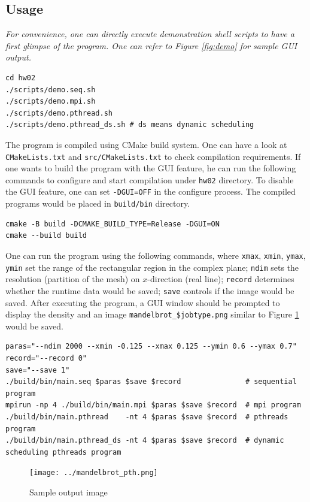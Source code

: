 \documentclass[twoside,12pt]{article}
\theoremstyle{definition}
\theoremstyle{remark}
\begin{document}
\subsection{Usage}
\textit{\color{red}
For convenience, one can directly execute 
demonstration shell scripts to have a first glimpse of the program.
One can refer to Figure \ref{fig:demo} for sample GUI output.
}
\begin{lstlisting}[style=sh]
cd hw02
./scripts/demo.seq.sh
./scripts/demo.mpi.sh
./scripts/demo.pthread.sh
./scripts/demo.pthread_ds.sh # ds means dynamic scheduling
\end{lstlisting}

The program is compiled using CMake build system.
One can have a look at \lstinline|CMakeLists.txt| and \lstinline|src/CMakeLists.txt| 
to check compilation requirements.
If one wants to build the program with the GUI feature, he can run the following commands to
configure and start compilation under \lstinline|hw02| directory.
To disable the GUI feature, one can set \lstinline|-DGUI=OFF| in the configure process.
The compiled programs would be placed in \lstinline|build/bin| directory.
\begin{lstlisting}[style=sh]
cmake -B build -DCMAKE_BUILD_TYPE=Release -DGUI=ON
cmake --build build
\end{lstlisting}

One can run the program using the following commands,
where \lstinline|xmax|, \lstinline|xmin|, \lstinline|ymax|, \lstinline|ymin|
set the range of the rectangular region in the complex plane;
\lstinline|ndim| sets the resolution (partition of the mesh) on
$x$-direction (real line);
\lstinline|record| determines whether the runtime data would be saved;
\lstinline|save| controls if the image would be saved.
After executing the program,
a GUI window should be prompted to display the density
and an image \lstinline|mandelbrot_$jobtype.png| similar to 
Figure \ref{fig:image} would be saved.
\begin{lstlisting}[style=sh]
paras="--ndim 2000 --xmin -0.125 --xmax 0.125 --ymin 0.6 --ymax 0.7"
record="--record 0"
save="--save 1"
./build/bin/main.seq $paras $save $record               # sequential program
mpirun -np 4 ./build/bin/main.mpi $paras $save $record  # mpi program   
./build/bin/main.pthread    -nt 4 $paras $save $record  # pthreads program
./build/bin/main.pthread_ds -nt 4 $paras $save $record  # dynamic scheduling pthreads program 
\end{lstlisting}
\begin{figure}[h!]
    \centering
    \texttt{[image: ../mandelbrot\_pth.png]}
    \caption{Sample output image}
    \label{fig:image}
\end{figure}
\end{document}
